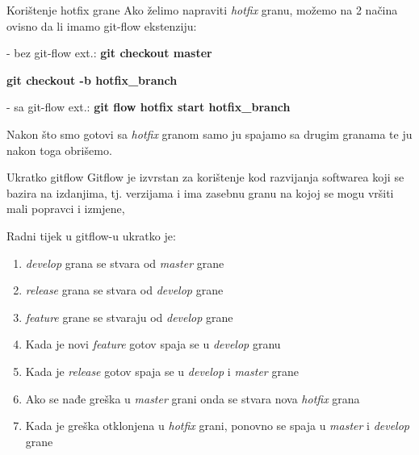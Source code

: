 \documentclass[10pt]{beamer}
\begin{document}
\begin{frame}{Korištenje hotfix grane}
Ako želimo napraviti \textit{hotfix} granu, možemo na 2 načina ovisno da li imamo git-flow ekstenziju:

- bez git-flow ext.: \textbf{git checkout master}

\textbf{git checkout -b hotfix\_branch}
                         
- sa git-flow ext.:  \textbf{git flow hotfix start hotfix\_branch}

Nakon što smo gotovi sa \textit{hotfix} granom samo ju spajamo sa drugim granama te ju nakon toga obrišemo.
\end{frame}
\begin{frame}{Ukratko gitflow}
Gitflow je izvrstan za korištenje kod razvijanja softwarea koji se bazira na izdanjima, tj. verzijama i ima zasebnu granu na kojoj se mogu vršiti mali popravci i izmjene,

Radni tijek u gitflow-u ukratko je:
\begin{enumerate}
    \item \textit{develop} grana se stvara od \textit{master} grane
    \item \textit{release} grana se stvara od \textit{develop} grane
    \item \textit{feature} grane se stvaraju od \textit{develop} grane
    \item Kada je novi \textit{feature} gotov spaja se u \textit{develop} granu
    \item Kada je \textit{release} gotov spaja se u \textit{develop} i \textit{master} grane
    \item Ako se nađe greška u \textit{master} grani onda se stvara nova \textit{hotfix} grana
    \item Kada je greška otklonjena u \textit{hotfix} grani, ponovno se spaja u \textit{master} i \textit{develop} grane
\end{enumerate}
\end{frame}
\end{document}
